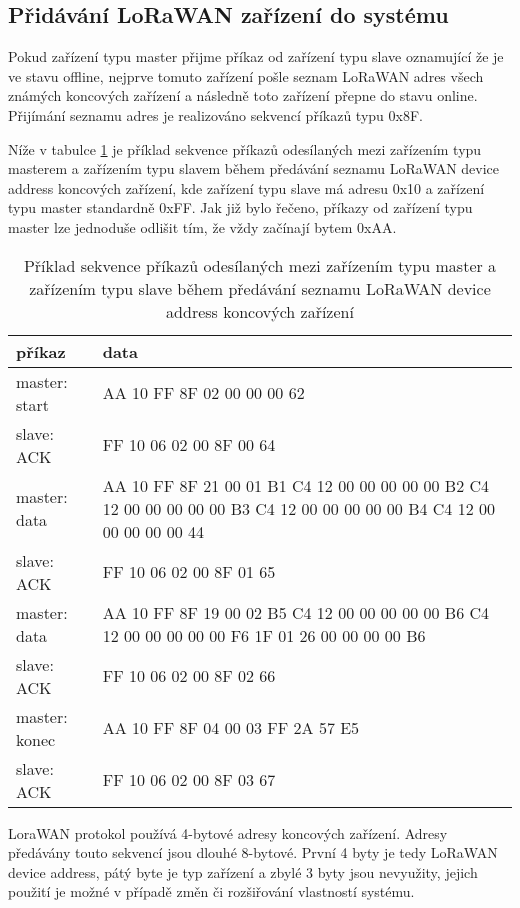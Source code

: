 \subsection{Přidávání LoRaWAN zařízení do systému}
Pokud zařízení typu master přijme příkaz od zařízení typu slave oznamující že je ve stavu offline, nejprve tomuto zařízení pošle seznam LoRaWAN adres všech známých koncových zařízení a následně toto zařízení přepne do stavu online.
Přijímání seznamu adres je realizováno sekvencí příkazů typu 0x8F. 

Níže v tabulce \ref{table:2} je příklad sekvence příkazů odesílaných mezi zařízením typu masterem a zařízením typu slavem během předávání seznamu LoRaWAN device address koncových zařízení, kde zařízení typu slave má adresu 0x10 a zařízení typu master standardně 0xFF. Jak již bylo řečeno, příkazy od zařízení typu master lze jednoduše odlišit tím, že vždy začínají bytem 0xAA.


\begin{table}[!h]
    \begin{tabular}{ |l|p{10cm}| }
    \hline
    příkaz      &  data    \\ \hline \hline
    master: start      &  AA 10 FF 8F 02 00 00 00 62    \\ \hline
    slave: ACK        &  FF 10 06 02 00 8F 00 64    \\ \hline
    master: data     &  AA 10 FF 8F 21 00 01 B1 C4 12 00 00 00 00 00 B2 C4 12 00 00 00 00 00 B3 C4 12 00 00 00 00 00 B4 C4 12 00 00 00 00 00 44 \\ \hline
    slave: ACK      &  FF 10 06 02 00 8F 01 65   \\ \hline
    master: data     &  AA 10 FF 8F 19 00 02 B5 C4 12 00 00 00 00 00 B6 C4 12 00 00 00 00 00 F6 1F 01 26 00 00 00 00 B6 \\ \hline
    slave: ACK      &   FF 10 06 02 00 8F 02 66   \\ \hline
    master: konec   &   AA 10 FF 8F 04 00 03 FF 2A 57 E5   \\ \hline
    slave: ACK      &   FF 10 06 02 00 8F 03 67  \\ \hline
    \end{tabular}
    \caption{Příklad sekvence příkazů odesílaných mezi zařízením typu master a zařízením typu slave během předávání seznamu LoRaWAN device address koncových zařízení}
    \label{table:2}
\end{table}

LoraWAN protokol používá 4-bytové adresy koncových zařízení.
Adresy předávány touto sekvencí jsou dlouhé 8-bytové. První 4 byty je tedy LoRaWAN device address, pátý byte je typ zařízení a zbylé 3 byty jsou nevyužity, jejich použití je možné v případě změn či rozšiřování vlastností systému. 

